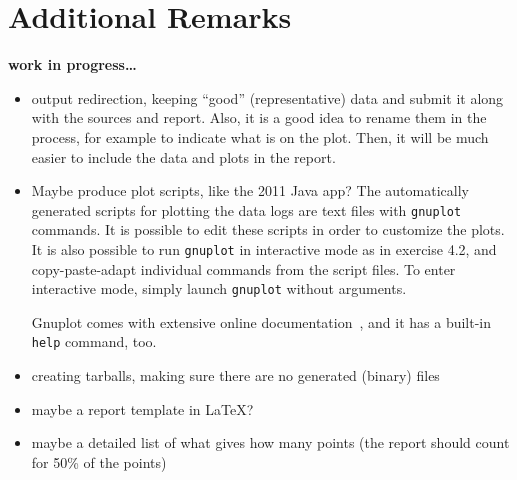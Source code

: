 \documentclass[a4paper,10pt]{article}
\begin{document}
\section{Additional Remarks}

\textbf{work in progress\ldots}

\begin{itemize}

\item
  output redirection, keeping ``good'' (representative) data and submit it along with the sources and report.
  Also, it is a good idea to rename them in the process, for example to indicate what is on the plot.
  Then, it will be much easier to include the data and plots in the report.

\item
  Maybe produce plot scripts, like the 2011 Java app?
The automatically generated scripts for plotting the data logs are text files with \texttt{gnuplot} commands.
It is possible to edit these scripts in order to customize the plots.
It is also possible to run \texttt{gnuplot} in interactive mode as in exercise 4.2, and copy-paste-adapt individual commands from the script files.
To enter interactive mode, simply launch \texttt{gnuplot} without arguments.

Gnuplot comes with extensive online documentation~\cite{gnuplot}, and it has a built-in \texttt{help} command, too.
  
\item
  creating tarballs, making sure there are no generated (binary) files

\item
  maybe a report template in LaTeX?

\item
  maybe a detailed list of what gives how many points (the report should count for 50\% of the points)

\end{itemize}


\footnotesize


\end{document}
